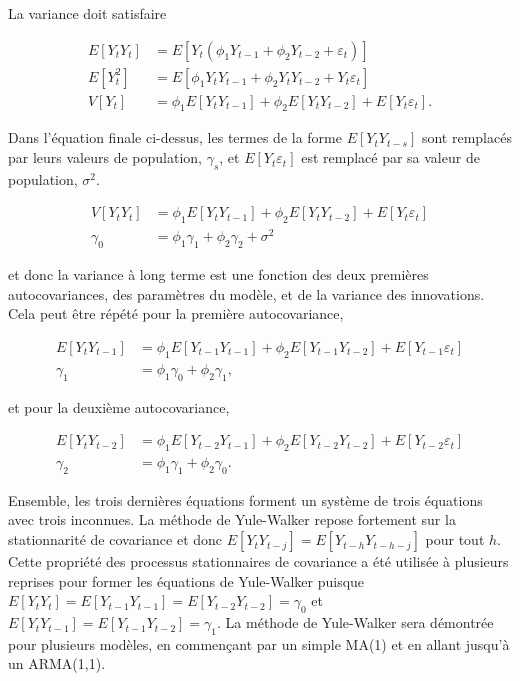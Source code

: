 \documentclass[
  letterpaper,
  DIV=11,
  numbers=noendperiod]{scrartcl}
\begin{document}
La variance doit satisfaire

\[
\begin{aligned}
E[Y_t Y_t] &= E[Y_t (\phi_1 Y_{t-1} + \phi_2 Y_{t-2} + \varepsilon_t)] \\
E[Y_t^2] &= E[\phi_1 Y_t Y_{t-1} + \phi_2 Y_t Y_{t-2} + Y_t \varepsilon_t] \\
V[Y_t] &= \phi_1 E[Y_t Y_{t-1}] + \phi_2 E[Y_t Y_{t-2}] + E[Y_t \varepsilon_t].
\end{aligned}
\]

Dans l'équation finale ci-dessus, les termes de la forme
\(E[Y_t Y_{t-s}]\) sont remplacés par leurs valeurs de population,
\(\gamma_s\), et \(E[Y_t \varepsilon_t]\) est remplacé par sa valeur de
population, \(\sigma^2\).

\[
\begin{aligned}
V[Y_t Y_t] &= \phi_1 E[Y_t Y_{t-1}] + \phi_2 E[Y_t Y_{t-2}] + E[Y_t \varepsilon_t] \\
\gamma_0 &= \phi_1 \gamma_1 + \phi_2 \gamma_2 + \sigma^2
\end{aligned}
\]

et donc la variance à long terme est une fonction des deux premières
autocovariances, des paramètres du modèle, et de la variance des
innovations. Cela peut être répété pour la première autocovariance,

\[
\begin{aligned}
E[Y_t Y_{t-1}] &= \phi_1 E[Y_{t-1} Y_{t-1}] + \phi_2 E[Y_{t-1} Y_{t-2}] + E[Y_{t-1} \varepsilon_t] \\
\gamma_1 &= \phi_1 \gamma_0 + \phi_2 \gamma_1,
\end{aligned}
\]

et pour la deuxième autocovariance,

\[
\begin{aligned}
E[Y_t Y_{t-2}] &= \phi_1 E[Y_{t-2} Y_{t-1}] + \phi_2 E[Y_{t-2} Y_{t-2}] + E[Y_{t-2} \varepsilon_t] \\
\gamma_2 &= \phi_1 \gamma_1 + \phi_2 \gamma_0.
\end{aligned}
\]

Ensemble, les trois dernières équations forment un système de trois
équations avec trois inconnues. La méthode de Yule-Walker repose
fortement sur la stationnarité de covariance et donc
\(E[Y_t Y_{t-j}] = E[Y_{t-h} Y_{t-h-j}]\) pour tout \(h\). Cette
propriété des processus stationnaires de covariance a été utilisée à
plusieurs reprises pour former les équations de Yule-Walker puisque
\(E[Y_t Y_t] = E[Y_{t-1} Y_{t-1}] = E[Y_{t-2} Y_{t-2}] = \gamma_0\) et
\(E[Y_t Y_{t-1}] = E[Y_{t-1} Y_{t-2}] = \gamma_1\). La méthode de
Yule-Walker sera démontrée pour plusieurs modèles, en commençant par un
simple MA(1) et en allant jusqu'à un ARMA(1,1).
\end{document}
